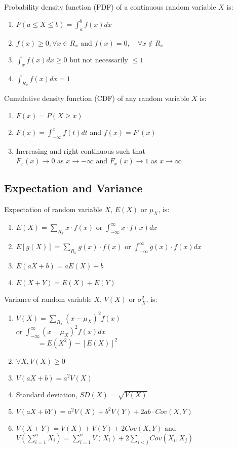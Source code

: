 \documentclass[12pt, a4paper]{article}
\begin{document}
\begin{multicols*}{3}
Probability density function (PDF) of a continuous random variable $X$ is:
\begin{enumerate}[\roman*.]
  \item $P(a\leq X\leq b) = \int^b_a f(x) dx$
  \item $f(x) \geq 0, \forall x\in R_x$ and $f(x) = 0,\quad\forall x \not\in R_x$
  \item $\int_x f(x) dx \geq 0$ but not necessarily $\leq 1$
  \item $\int_{R_x} f(x) dx = 1$
\end{enumerate}

Cumulative density function (CDF) of any random variable $X$ is:
\begin{enumerate}[\roman*.]
  \item $F(x) = P(X \geq x)$
  \item $F(x) = \int^x_{-\infty}f(t)dt$ and $f(x) = F'(x)$
  \item Increasing and right continuous such that \\$F_x(x) \rightarrow 0$ as $x\rightarrow -\infty$ and $F_x(x) \rightarrow 1$ as $x\rightarrow \infty$
\end{enumerate}

\subsection{Expectation and Variance}
Expectation of random variable $X$, $E(X)$ or $\mu_X$, is:
\begin{enumerate}[\roman*.]
  \item $E(X) = \sum_{R_x} x\cdot f(x)$ or $\int^{\infty}_{-\infty}x\cdot f(x) dx$
  \item $E[g(X)] = \sum_{R_x} g(x)\cdot f(x)$ or $\int^{\infty}_{-\infty}g(x)\cdot f(x) dx$
  \item $E(aX+b) = aE(X) + b$
  \item $E(X+Y) = E(X) + E(Y)$
\end{enumerate}

Variance of random variable $X$, $V(X)$ or $\sigma^2_X$, is:
\begin{enumerate}[\roman*.]
  \item $V(X) = \sum_{R_x}(x-\mu_X)^2f(x)$\\\quad\quad\quad or $\int^{\infty}_{-\infty}(x-\mu_{X})^2f(x)dx$\\$\quad\quad\quad=E(X^2)-[E(X)]^2$
  \item $\forall X, V(X) \geq 0$
  \item $V(aX+b) = a^2V(X)$
  \item Standard deviation, $SD(X) = \sqrt{V(X)}$
  \item $V(aX+bY) = a^2V(X)+b^2V(Y)+2ab\cdot Cov(X,Y)$
  \item $V(X+Y) = V(X) + V(Y) + 2 Cov(X,Y)$ and $V(\sum^n_{i=1}X_i) = \sum^n_{i=1}V(X_i) + 2\sum_{i<j}Cov(X_i, X_j)$
\vspace{-1em}
\end{enumerate}
\colbreak

\end{multicols*}
\end{document}
